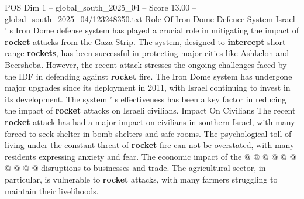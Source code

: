 \begin{textsample}{POS Dim 1 – global\_south\_2025\_04 – Score 13.00 – global\_south\_2025\_04/123248350.txt}
Role Of Iron Dome Defence System Israel ' s Iron Dome defense system has played a crucial role in mitigating the impact of \textbf{rocket} attacks from the Gaza Strip.
The system, designed to \textbf{intercept} short-range \textbf{rockets}, has been successful in protecting major cities like Ashkelon and Beersheba.
However, the recent attack stresses the ongoing challenges faced by the IDF in defending against \textbf{rocket} fire.
The Iron Dome system has undergone major upgrades since its deployment in 2011, with Israel continuing to invest in its development.
The system ' s effectiveness has been a key factor in reducing the impact of \textbf{rocket} attacks on Israeli civilians.
Impact On Civilians The recent \textbf{rocket} attack has had a major impact on civilians in southern Israel, with many forced to seek shelter in bomb shelters and safe rooms.
The psychological toll of living under the constant threat of \textbf{rocket} fire can not be overstated, with many residents expressing anxiety and fear.
The economic impact of the @ @ @ @ @ @ @ @ @ @ disruptions to businesses and trade.
The agricultural sector, in particular, is vulnerable to \textbf{rocket} attacks, with many farmers struggling to maintain their livelihoods.

\end{textsample}
